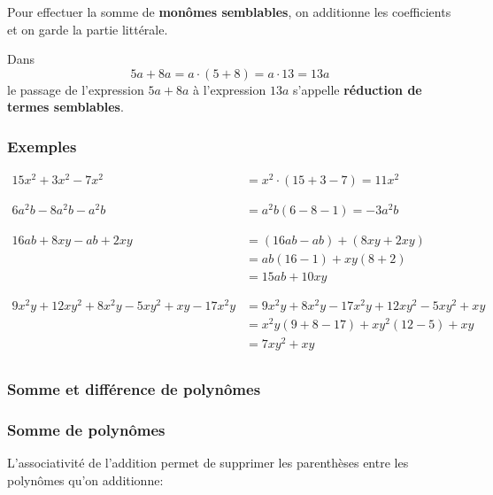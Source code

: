 \documentclass[
  12pt,
]{book}
\begin{document}
\begin{defbox}
Pour effectuer la somme de \textbf{monômes semblables}, on additionne les coefficients et on garde la partie littérale.

\end{defbox}

Dans
\[5a+8a = a\cdot(5+8)=a\cdot 13=13a\]
le passage de l'expression \(5a+8a\) à l'expression \(13a\) s'appelle \textbf{réduction de termes semblables}.

\hypertarget{exemples-11}{%
\subsubsection*{Exemples}\label{exemples-11}}

\begin{align*}
15x^2+3x^2-7x^2  & = x^2\cdot(15+3-7)=11x^2\\
\\\\
6a^2b-8a^2b-a^2b & = a^2b(6-8-1)=-3a^2b\\
\\\\
16ab+8xy-ab+2xy &= (16ab-ab)+(8xy+2xy)\\
               &= ab(16-1)+xy(8+2)\\
               &= 15ab+10xy\\
\\\\
9x^2y+12xy^2+8x^2y-5xy^2+xy-17x^2y &= 9x^2y+8x^2y-17x^2y+12xy^2-5xy^2+xy\\
&= x^2y(9+8-17)+xy^2(12-5)+xy\\
&= 7xy^2+xy\\
\end{align*}

\hypertarget{somme-et-diffuxe9rence-de-polynuxf4mes}{%
\subsubsection{Somme et différence de polynômes}\label{somme-et-diffuxe9rence-de-polynuxf4mes}}

\hypertarget{somme-de-polynuxf4mes}{%
\subsubsection*{Somme de polynômes}\label{somme-de-polynuxf4mes}}

L'associativité de l'addition permet de supprimer les parenthèses entre les polynômes qu'on additionne:
\end{document}
